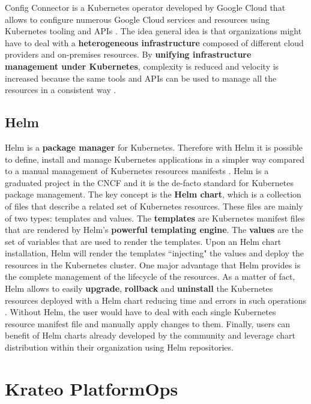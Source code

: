 Config Connector is a Kubernetes operator developed by Google Cloud that allows to configure numerous Google Cloud services and resources using Kubernetes tooling and APIs \cite{gcp_config_connector}.
The idea general idea is that organizations might have to deal with a \textbf{heterogeneous infrastructure} composed of different cloud providers and on-premises resources. 
By \textbf{unifying infrastructure management under Kubernetes}, complexity is reduced and velocity is increased because the same tools and APIs can be used to manage all the resources in a consistent way \cite{gcp_config_connector}.




\subsection{Helm}

Helm is a \textbf{package manager} for Kubernetes. Therefore with Helm it is possible to define, install and manage Kubernetes applications in a simpler way compared to a manual management of Kubernetes resources manifests \cite{helm}.
Helm is a graduated project in the CNCF and it is the de-facto standard for Kubernetes package management.
The key concept is the \textbf{Helm chart}, which is a collection of files that describe a related set of Kubernetes resources. 
These files are mainly of two types: templates and values.
The \textbf{templates} are Kubernetes manifest files that are rendered by Helm's \textbf{powerful templating engine}. 
The \textbf{values} are the set of variables that are used to render the templates.
Upon an Helm chart installation, Helm will render the templates ``injecting" the values and deploy the resources in the Kubernetes cluster. 
One major advantage that Helm provides is the complete management of the lifecycle of the resources.
As a matter of fact, Helm allows to easily \textbf{upgrade}, \textbf{rollback} and \textbf{uninstall} the Kubernetes resources deployed with a Helm chart reducing time and errors in such operations \cite{helm}. 
Without Helm, the user would have to deal with each single Kubernetes resource manifest file and manually apply changes to them.
Finally, users can benefit of Helm charts already developed by the community and leverage chart distribution within their organization using Helm repositories.

\section{Krateo PlatformOps}
\label{sec:krateo}


